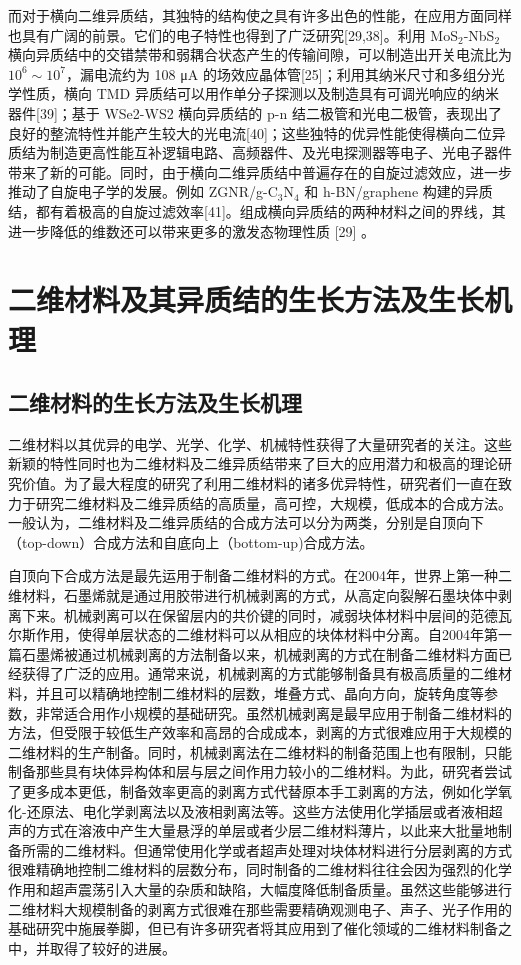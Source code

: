     而对于横向二维异质结，其独特的结构使之具有许多出色的性能，在应用方面同样也具有广阔的前景。它们的电子特性也得到了广泛研究[29,38]。利用 MoS$_2$-NbS$_2$ 横向异质结中的交错禁带和弱耦合状态产生的传输间隙，可以制造出开关电流比为 $10^6 \sim 10^7$，漏电流约为 108 \si{\micro\ampere} 的场效应晶体管[25]；利用其纳米尺寸和多组分光学性质，横向 TMD 异质结可以用作单分子探测以及制造具有可调光响应的纳米器件[39]；基于 WSe2-WS2 横向异质结的 p-n 结二极管和光电二极管，表现出了良好的整流特性并能产生较大的光电流[40]；这些独特的优异性能使得横向二位异质结为制造更高性能互补逻辑电路、高频器件、及光电探测器等电子、光电子器件带来了新的可能。同时，由于横向二维异质结中普遍存在的自旋过滤效应，进一步推动了自旋电子学的发展。例如 ZGNR/g-C$_3$N$_4$ 和 h-BN/graphene 构建的异质结，都有着极高的自旋过滤效率[41]。组成横向异质结的两种材料之间的界线，其进一步降低的维数还可以带来更多的激发态物理性质 [29] 。

\section{二维材料及其异质结的生长方法及生长机理}
\subsection{二维材料的生长方法及生长机理}
    二维材料以其优异的电学、光学、化学、机械特性获得了大量研究者的关注。这些新颖的特性同时也为二维材料及二维异质结带来了巨大的应用潜力和极高的理论研究价值。为了最大程度的研究了利用二维材料的诸多优异特性，研究者们一直在致力于研究二维材料及二维异质结的高质量，高可控，大规模，低成本的合成方法。一般认为，二维材料及二维异质结的合成方法可以分为两类，分别是自顶向下（top-down）合成方法和自底向上（bottom-up)合成方法。%

    自顶向下合成方法是最先运用于制备二维材料的方式。在2004年，世界上第一种二维材料，石墨烯就是通过用胶带进行机械剥离的方式，从高定向裂解石墨块体中剥离下来。机械剥离可以在保留层内的共价键的同时，减弱块体材料中层间的范德瓦尔斯作用，使得单层状态的二维材料可以从相应的块体材料中分离。自2004年第一篇石墨烯被通过机械剥离的方法制备以来，机械剥离的方式在制备二维材料方面已经获得了广泛的应用。通常来说，机械剥离的方式能够制备具有极高质量的二维材料，并且可以精确地控制二维材料的层数，堆叠方式、晶向方向，旋转角度等参数，非常适合用作小规模的基础研究。虽然机械剥离是最早应用于制备二维材料的方法，但受限于较低生产效率和高昂的合成成本，剥离的方式很难应用于大规模的二维材料的生产制备。同时，机械剥离法在二维材料的制备范围上也有限制，只能制备那些具有块体异构体和层与层之间作用力较小的二维材料。为此，研究者尝试了更多成本更低，制备效率更高的剥离方式代替原本手工剥离的方法，例如化学氧化-还原法、电化学剥离法以及液相剥离法等。这些方法使用化学插层或者液相超声的方式在溶液中产生大量悬浮的单层或者少层二维材料薄片，以此来大批量地制备所需的二维材料。但通常使用化学或者超声处理对块体材料进行分层剥离的方式很难精确地控制二维材料的层数分布，同时制备的二维材料往往会因为强烈的化学作用和超声震荡引入大量的杂质和缺陷，大幅度降低制备质量。虽然这些能够进行二维材料大规模制备的剥离方式很难在那些需要精确观测电子、声子、光子作用的基础研究中施展拳脚，但已有许多研究者将其应用到了催化领域的二维材料制备之中，并取得了较好的进展。

